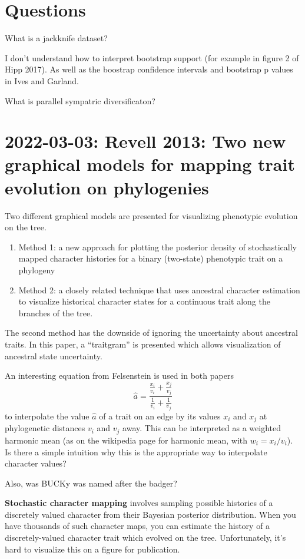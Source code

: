 \documentclass{article}
\begin{document}
\section{Questions} What is a jackknife dataset?

I don't understand how to interpret bootstrap support (for example in figure 2
of Hipp 2017). As well as the boostrap confidence intervals and bootstrap p
values in Ives and Garland. 

What is parallel sympatric diversificaton?


\section{2022-03-03: Revell 2013: Two new graphical models for mapping trait
  evolution on phylogenies}

Two different graphical models are presented for visualizing phenotypic
evolution on the tree.
\begin{enumerate}
\item Method 1: a new approach for plotting the posterior density of
  stochastically mapped character histories for a binary (two-state) phenotypic
  trait on a phylogeny
\item Method 2: a closely related technique that uses ancestral character
  estimation to visualize historical character states for a continuous trait
  along the branches of the tree.
\end{enumerate}
The second method has the downside of ignoring the uncertainty about ancestral
traits. In this paper, a ``traitgram'' is presented which allows visualization
of ancestral state uncertainty.

An interesting equation from Felsenstein is used in both papers
\begin{equation*}
  \hat{a}= \frac
  {\frac{x_{i}}{v_{i}}+ \frac{x_{j}}{v_{j}}}
  {\frac{1}{v_{i}}+\frac{1}{v_{j}}}
\end{equation*}
to interpolate the value $\hat{a}$ of a trait on an edge by its values $x_{i}$
and $x_{j}$ at phylogenetic distances $v_{i}$ and $v_{j}$ away. This can be interpreted as a weighted harmonic mean (as on the wikipedia page for harmonic mean, with $w_{i}=x_{i}/v_{i}$). Is there a simple intuition why this is the appropriate way to interpolate character values? 

Also, was BUCKy was named after the badger?

\textbf{Stochastic character mapping} involves sampling possible histories of a
discretely valued character from their Bayesian posterior distribution. When you
have thousands of such character maps, you can estimate the history of a
discretely-valued character trait which evolved on the tree. Unfortunately, it's
hard to visualize this on a figure for publication.
\end{document}

